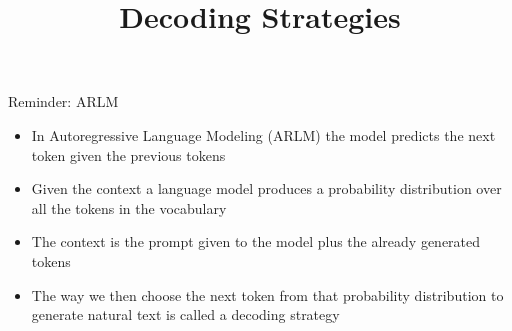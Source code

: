 




\newcommand{\learninggoals}{
\item Get to know the concept of decoding in NLP
\item Learn about different decoding strategies  
}
\def\myblue#1{\textcolor{texblue}{#1}}

\title{Decoding Strategies}
\date{}




\begin{vbframe}{Reminder: ARLM}

\vfill

\begin{itemize}
    \item In Autoregressive Language Modeling (ARLM) the model predicts the next token given the previous tokens
    \item Given the context a language model produces a probability distribution over all the tokens in the vocabulary
    \item The context is the prompt given to the model plus the already generated tokens
    \item The way we then choose the next token from that probability distribution to generate natural text is called a decoding strategy
\end{itemize}

\vfill
    
\end{vbframe}


